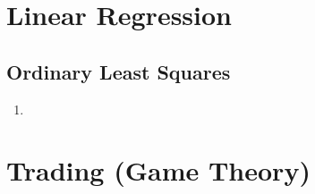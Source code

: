 \documentclass[letterpaper, 11pt]{article}
\newcommand{\1}{\mathds{1}}	%
\theoremstyle{definition}
\begin{document}


\section{Linear Regression}
\subsection{Ordinary Least Squares}
\begin{enumerate}
    \item 
\end{enumerate}

\section{Trading (Game Theory)}
\end{document}
